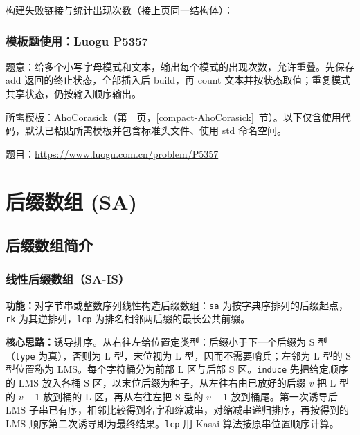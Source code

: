 \Needspace{532pt}



\newpage

\noindent 构建失败链接与统计出现次数（接上页同一结构体）：



\Needspace{391pt}

\subsection*{模板题使用：Luogu P5357}

\label{usage-example-70}

题意：给多个小写字母模式和文本，输出每个模式的出现次数，允许重叠。先保存 add 返回的终止状态，全部插入后 build，再 count 文本并按状态取值；重复模式共享状态，仍按输入顺序输出。

所需模板：\hyperref[compact-AhoCorasick]{AhoCorasick}（第~\pageref{compact-AhoCorasick}~页，\ref{compact-AhoCorasick}~节）。以下仅含使用代码，默认已粘贴所需模板并包含标准头文件、使用 std 命名空间。

题目：\url{https://www.luogu.com.cn/problem/P5357}



\newpage

\chapter{后缀数组 (SA)}

\section{后缀数组简介}

\subsection{线性后缀数组（SA-IS）}\label{compact-SAIS}

\noindent\textbf{功能：}\allowbreak 对字节串或整数序列线性构造后缀数组：\texttt{sa} 为按字典序排列的后缀起点，\texttt{rk} 为其逆排列，\texttt{lcp} 为排名相邻两后缀的最长公共前缀。

\textbf{核心思路：}\allowbreak 诱导排序。从右往左给位置定类型：后缀小于下一个后缀为 S 型（\texttt{type} 为真），否则为 L 型，末位视为 L 型，因而不需要哨兵；左邻为 L 型的 S 型位置称为 LMS。每个字符桶分为前部 L 区与后部 S 区。\texttt{induce} 先把给定顺序的 LMS 放入各桶 S 区，以末位后缀为种子，从左往右由已放好的后缀 $v$ 把 L 型的 $v-1$ 放到桶的 L 区，再从右往左把 S 型的 $v-1$ 放到桶尾。第一次诱导后 LMS 子串已有序，相邻比较得到名字和缩减串，对缩减串递归排序，再按得到的 LMS 顺序第二次诱导即为最终结果。\texttt{lcp} 用 Kasai 算法按原串位置顺序计算。

